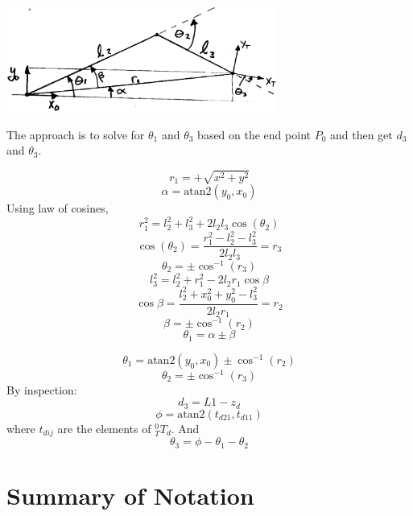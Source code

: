\begin{Example}
\includegraphics[width=3.5in]{figs04/00254.eps}

The approach is to solve for $\theta_1$ and $\theta_3$ based on the end point $P_0$
and then get $d_3$ and $\theta_3$.

\end{Example}
\newpage
\begin{ExampleCont}
\[
r_1 = +\sqrt{x^2+y^2}
\]
\[
\alpha = \mathrm{atan2}(y_0,x_0)
\]
Using law of cosines,
\[
r_1^2 = l_2^2 + l_3^2 + 2l_2l_3\cos(\theta_2)
\]
\[
\cos(\theta_2) = \frac{r_1^2 - l_2^2 - l_3^2}{2l_2l_3} = r_3
\]
\[
\theta_2 = \pm \cos^{-1}(r_3)
\]
\[
l_3^2 = l_2^2 + r_1^2 - 2l_2r_1\cos\beta
\]
\[
\cos\beta = \frac{l_2^2 + x_0^2+y_0^2-l_3^2}{2l_2r_1} = r_2
\]
\[
\beta = \pm \cos^{-1}(r_2)
\]
\[
\theta_1 = \alpha \pm \beta
\]

\[
\theta_1 = \mathrm{atan2}(y_0,x_0) \pm \cos^{-1}(r_2)
\]
\[
\theta_2 = \pm \cos^{-1}(r_3)
\]
By inspection:
\[
d_3= L1 - z_d
\]
\[
\phi = \mathrm{atan2}(t_{d21}, t_{d11})
\]
where $t_{dij}$ are the elements of $^0_TT_d$. And
\[
\theta_3 = \phi - \theta_1 - \theta_2
\]
\end{ExampleCont}


\section{Summary of Notation}


